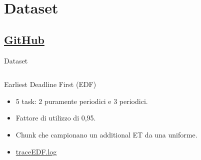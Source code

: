 \section{Dataset}
\subsection{\href{https://github.com/edoardosarri24/real-time-scheduling-simulator.git}{GitHub}}

\begin{frame}{Dataset}
    \begin{columns}
        \begin{column}{.6\textwidth}
            \begin{block}{Earliest Deadline First (EDF)}
                \begin{itemize}
                    \item 5 task: 2 puramente periodici e 3 periodici.
                    \item Fattore di utilizzo di 0,95.
                    \item Chunk che campionano un additional ET da una uniforme.
                    \item \href{https://github.com/edoardosarri24/real-time-scheduling-simulator/blob/master/output/traceEDF.log}{traceEDF.log}
                \end{itemize}
            \end{block}
        \end{column}
        \begin{column}{.4\textwidth}
            \centering

\end{column}
\end{columns}
\end{frame}
